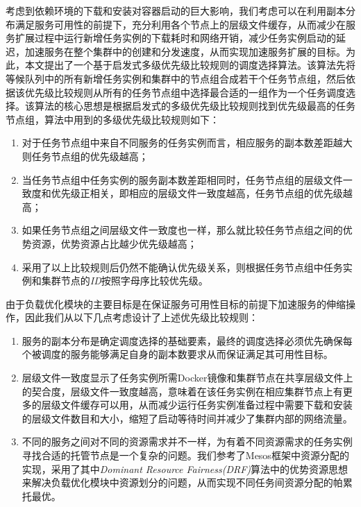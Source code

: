 考虑到依赖环境的下载和安装对容器启动的巨大影响，我们考虑可以在利用副本分布满足服务可用性的前提下，充分利用各个节点上的层级文件缓存，从而减少在服务扩展过程中运行新增任务实例的下载耗时和网络开销，减少任务实例启动的延迟，加速服务在整个集群中的创建和分发速度，从而实现加速服务扩展的目标。为此，本文提出了一个基于启发式多级优先级比较规则的调度选择算法。该算法先将等候队列中的所有新增任务实例和集群中的节点组合成若干个任务节点组，然后依据该优先级比较规则从所有的任务节点组中选择最合适的一组作为一个任务调度选择。该算法的核心思想是根据启发式的多级优先级比较规则找到优先级最高的任务节点组，算法中用到的多级优先级比较规则如下：
\begin{enumerate}
\item 对于任务节点组中来自不同服务的任务实例而言，相应服务的副本数差距越大则任务节点组的优先级越高；
\item 当任务节点组中任务实例的服务副本数差距相同时，任务节点组的层级文件一致度和优先级正相关，即相应的层级文件一致度越高，任务节点组的优先级越高；
\item 如果任务节点组之间层级文件一致度也一样，那么就比较任务节点组之间的优势资源，优势资源占比越少优先级越高；
\item 采用了以上比较规则后仍然不能确认优先级关系，则根据任务节点组中任务实例和集群节点的\emph{ID}按照字母序比较优先级。
\end{enumerate}

由于负载优化模块的主要目标是在保证服务可用性目标的前提下加速服务的伸缩操作，因此我们从以下几点考虑设计了上述优先级比较规则：
\begin{enumerate}
\item 服务的副本分布是确定调度选择的基础要素，最终的调度选择必须优先确保每个被调度的服务能够满足自身的副本数要求从而保证满足其可用性目标。
\item 层级文件一致度显示了任务实例所需Docker镜像和集群节点在共享层级文件上的契合度，层级文件一致度越高，意味着在该任务实例在相应集群节点上有更多的层级文件缓存可以用，从而减少运行任务实例准备过程中需要下载和安装的层级文件数目和大小，缩短了启动等待时间并减少了集群内部的网络流量。
\item 不同的服务之间对不同的资源需求并不一样，为有着不同资源需求的任务实例寻找合适的托管节点是一个复杂的问题。我们参考了Mesos框架中资源分配的实现，采用了其中\emph{Dominant Resource Fairness(DRF)}算法中的优势资源思想来解决负载优化模块中资源划分的问题，从而实现不同任务间资源分配的帕累托最优\cite{ghodsi2011dominant}。
\end{enumerate}

